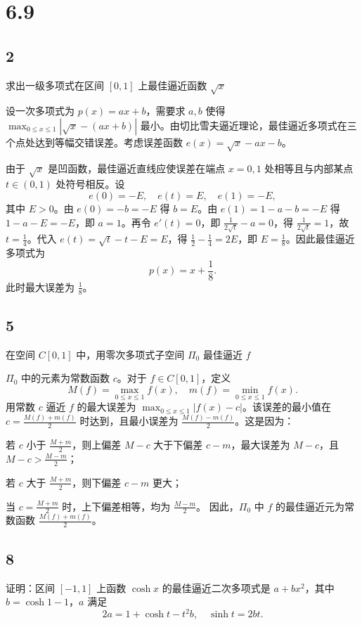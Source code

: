 \documentclass{article}
\begin{document}
\section*{6.9}

\subsection*{2}
求出一级多项式在区间 \([0, 1]\) 上最佳逼近函数 \(\sqrt{x}\)

设一次多项式为 \(p(x) = ax + b\)，需要求 \(a, b\) 使得 \(\max_{0 \le x \le 1} |\sqrt{x} - (ax + b)|\) 最小。由切比雪夫逼近理论，最佳逼近多项式在三个点处达到等幅交错误差。考虑误差函数 \(e(x) = \sqrt{x} - ax - b\)。

由于 \(\sqrt{x}\) 是凹函数，最佳逼近直线应使误差在端点 \(x=0,1\) 处相等且与内部某点 \(t \in (0,1)\) 处符号相反。设
\[
e(0) = -E, \quad e(t) = E, \quad e(1) = -E,
\]
其中 \(E > 0\)。由 \(e(0) = -b = -E\) 得 \(b = E\)。由 \(e(1) = 1 - a - b = -E\) 得 \(1 - a - E = -E\)，即 \(a = 1\)。再令 \(e'(t) = 0\)，即 \(\frac{1}{2\sqrt{t}} - a = 0\)，得 \(\frac{1}{2\sqrt{t}} = 1\)，故 \(t = \frac{1}{4}\)。代入 \(e(t) = \sqrt{t} - t - E = E\)，得 \(\frac{1}{2} - \frac{1}{4} = 2E\)，即 \(E = \frac{1}{8}\)。因此最佳逼近多项式为
\[
p(x) = x + \frac{1}{8}.
\]
此时最大误差为 \(\frac{1}{8}\)。

\subsection*{5}
在空间 \(C[0,1]\) 中，用零次多项式子空间 \(\Pi_0\) 最佳逼近 \(f\)

\(\Pi_0\) 中的元素为常数函数 \(c\)。对于 \(f \in C[0,1]\)，定义
\[
M(f) = \max_{0 \le x \le 1} f(x), \quad m(f) = \min_{0 \le x \le 1} f(x).
\]
用常数 \(c\) 逼近 \(f\) 的最大误差为 \(\max_{0 \le x \le 1} |f(x) - c|\)。该误差的最小值在 \(c = \frac{M(f) + m(f)}{2}\) 时达到，且最小误差为 \(\frac{M(f) - m(f)}{2}\)。这是因为：

若 \(c\) 小于 \(\frac{M+m}{2}\)，则上偏差 \(M-c\) 大于下偏差 \(c-m\)，最大误差为 \(M-c\)，且 \(M-c > \frac{M-m}{2}\)；

若 \(c\) 大于 \(\frac{M+m}{2}\)，则下偏差 \(c-m\) 更大；

当 \(c = \frac{M+m}{2}\) 时，上下偏差相等，均为 \(\frac{M-m}{2}\)。
因此，\(\Pi_0\) 中 \(f\) 的最佳逼近元为常数函数 \(\frac{M(f)+m(f)}{2}\)。

\subsection*{8}
证明：区间 \([-1,1]\) 上函数 \(\cosh x\) 的最佳逼近二次多项式是 \(a + b x^2\)，其中 \(b = \cosh 1 - 1\)，\(a\) 满足
\[
2a = 1 + \cosh t - t^2 b, \quad \sinh t = 2b t.
\]
\end{document}
